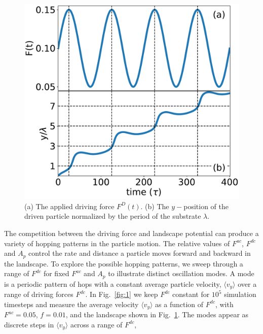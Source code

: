\documentclass[twocolumn,preprintnumbers,amsmath,amssymb,aps,prx]{revtex4}
\begin{document}
\begin{center}
\begin{figure}[h!]
\centering
\includegraphics[width=\columnwidth]{single_particle.pdf}
\caption{(a) The applied driving force $F^D(t)$. %
  (b) 
  The $y-$position of the driven particle
  normalized by the period of the substrate $\lambda$.
  }
\label{fig:0}
\end{figure}
\end{center}

The competition between the driving force and landscape potential
can produce a variety of hopping patterns in the particle motion. 
%
The relative values of $F^{ac}$, $F^{dc}$ and $A_p$
control the rate and distance a  particle moves 
forward and backward in the landscape.
To explore the possible hopping patterns,
we sweep through a range of $F^{dc}$ for fixed $F^{ac}$ and $A_p$
to illustrate
distinct oscillation modes. %
A mode is a periodic pattern of hops
with a constant average particle velocity, $\langle {v}_{y} \rangle$
over a range of driving forces $F^{dc}$.
In Fig.~\ref{fig:1} 
we keep $F^{dc}$ constant
for $10^5$ simulation timesteps
and 
measure the average velocity $\langle v_y \rangle $ 
as a function of $F^{dc}$,
with $F^{ac} = 0.05$, $f=0.01$, and the landscape %
shown in Fig.~\ref{fig:0}.
The modes appear as 
discrete steps in $\langle v_y \rangle$ %
across a range of $F^{dc}$,
\end{document}
